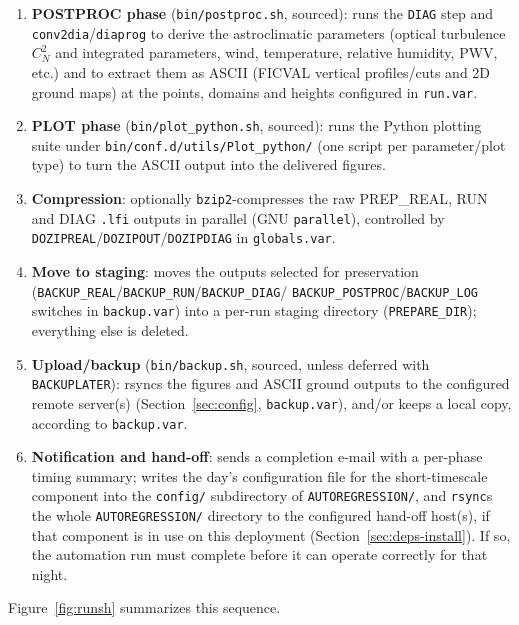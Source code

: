 \begin{enumerate}
        raw \texttt{.lfi} model output for the whole forecast segment.
  \item \textbf{POSTPROC phase} (\texttt{bin/postproc.sh}, sourced): runs the \texttt{DIAG} step and
        \texttt{conv2dia}\slash\texttt{diaprog} to derive the astroclimatic parameters (optical
        turbulence $C_N^2$ and integrated parameters, wind, temperature, relative humidity, PWV, etc.)
        and to extract them as ASCII (FICVAL vertical profiles/cuts and 2D ground maps) at the points,
        domains and heights configured in \texttt{run.var}.
  \item \textbf{PLOT phase} (\texttt{bin/plot\_python.sh}, sourced): runs the Python plotting suite
        under \texttt{bin/conf.d/utils/Plot\_python/} (one script per parameter/plot type) to turn the
        ASCII output into the delivered figures.
  \item \textbf{Compression}: optionally \texttt{bzip2}-compresses the raw PREP\_REAL, RUN and DIAG
        \texttt{.lfi} outputs in parallel (GNU \texttt{parallel}), controlled by
        \texttt{DOZIPREAL}\slash\texttt{DOZIPOUT}\slash\texttt{DOZIPDIAG} in \texttt{globals.var}.
  \item \textbf{Move to staging}: moves the outputs selected for preservation
        (\texttt{BACKUP\_REAL}\slash\texttt{BACKUP\_RUN}\slash\texttt{BACKUP\_DIAG}\slash
        \texttt{BACKUP\_POSTPROC}\slash\texttt{BACKUP\_LOG} switches in \texttt{backup.var}) into a
        per-run staging directory (\texttt{PREPARE\_DIR}); everything else is deleted.
  \item \textbf{Upload/backup} (\texttt{bin/backup.sh}, sourced, unless deferred with
        \texttt{BACKUPLATER}): rsyncs the figures and ASCII ground outputs to the configured remote
        server(s) (Section~\ref{sec:config}, \texttt{backup.var}), and/or keeps a local copy, according
        to \texttt{backup.var}.
  \item \textbf{Notification and hand-off}: sends a completion e-mail with a per-phase timing summary;
        writes the day's configuration file for the short-timescale component into the \texttt{config/}
        subdirectory of \texttt{AUTOREGRESSION/}, and \texttt{rsync}s the whole \texttt{AUTOREGRESSION/}
        directory to the configured hand-off host(s), if that component is in use on this deployment
        (Section~\ref{sec:deps-install}). If so, the automation run must complete before it can operate
        correctly for that night.
\end{enumerate}
Figure~\ref{fig:runsh} summarizes this sequence.


